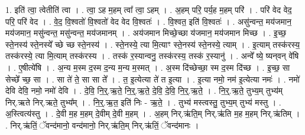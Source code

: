 \documentclass[17pt]{extarticle}
\begin{document}
1. इति॑ त्वा॒ त्वेतीति॑ त्वा । . त्वा॒ ऽह म॒हम् त्वा᳚ त्वा॒ ऽहम् । . अ॒हम् परि॒ पर्य॒ह म॒हम् परि॑ । . परि॑ वेद वेद॒ परि॒ परि॑ वेद । . वे॒द॒ वि॒श्वतो॑ वि॒श्वतो॑ वेद वेद वि॒श्वतः॑ । . वि॒श्वत॒ इति॑ वि॒श्वतः॑ । . असु॑न्वन्त॒ मय॑जमान॒ मय॑जमान॒ मसु॑न्वन्त॒ मसु॑न्वन्त॒ मय॑जमानम् । . अय॑जमान मिच्छे॒च्छा य॑जमान॒ मय॑जमान मिच्छ । . इ॒च्छ॒ स्ते॒नस्य॑ स्ते॒नस्ये᳚ च्छे च्छ स्ते॒नस्य॑ । . स्ते॒नस्ये॒ त्या मि॒त्याꣳ स्ते॒नस्य॑ स्ते॒नस्ये॒ त्याम् । . इ॒त्याम् तस्क॑रस्य॒ तस्क॑रस्ये॒ त्या मि॒त्याम् तस्क॑रस्य । . तस्क॑ र॒स्यान्वनु॒ तस्क॑रस्य॒ तस्क॑ र॒स्यानु॑ । . अन्वे᳚ ष्ये॒ ष्यन्‌वन् वे॑षि । . ए॒षीत्ये॑षि । . अ॒न्य म॒स्म द॒स्म द॒न्य म॒न्य म॒स्मत् । . अ॒स्म दि॑च्छेच्छा॒ स्म द॒स्म दि॑च्छ । . इ॒च्छ॒ सा सेच्छे᳚ च्छ॒ सा । . सा ते॑ ते॒ सा सा ते᳚ । . त॒ इ॒त्येत्या ते॑ त इ॒त्या । . इ॒त्या नमो॒ नम॑ इ॒त्येत्या नमः॑ । . नमो॑ देवि देवि॒ नमो॒ नमो॑ देवि । . दे॒वि॒ नि॒र्॒.ऋ॒ते॒ नि॒र्॒.ऋ॒ते॒ दे॒वि॒ दे॒वि॒ नि॒र्॒.ऋ॒ते॒ । . नि॒र्॒.ऋ॒ते॒ तुभ्य॒म् तुभ्य॑म् निर्.ऋते निर्.ऋते॒ तुभ्य᳚म् । . नि॒र्॒.ऋ॒त॒ इति॑ निः - ऋ॒ते॒ । . तुभ्य॑ मस्त्वस्तु॒ तुभ्य॒म् तुभ्य॑ मस्तु । . अ॒स्त्वित्य॑स्तु । . दे॒वी म॒ह म॒हम् दे॒वीम् दे॒वी म॒हम् । . अ॒हम् निर्.ऋ॑ति॒म् निर्.ऋ॑ति म॒ह म॒हम् निर्.ऋ॑तिम् । . निर्.ऋ॑तिं॒ ॅवन्द॑मानो॒ वन्द॑मानो॒ निर्.ऋ॑ति॒म् निर्.ऋ॑तिं॒ ॅवन्द॑मानः । \newline
\end{document}
